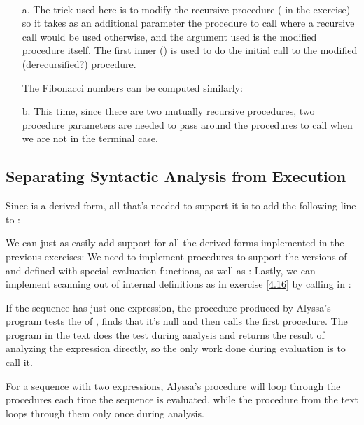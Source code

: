 \begin{exe}[4.21]
    \ \vspace{-20pt}
    \begin{itemize}
	\item[a.] The trick used here is to modify the recursive procedure 
	    ( in the exercise) so it takes as an 
	    additional parameter the procedure to call where a recursive call 
	    would be used otherwise, and the argument used is the modified 
	    procedure itself. The first inner 
	    () is used to do the initial call to the 
	    modified (derecursified?) procedure.

	    The Fibonacci numbers can be computed similarly:

	\item[b.] This time, since there are two mutually recursive procedures, 
	    two procedure parameters are needed to pass around the procedures to 
	    call when we are not in the terminal case.
    \end{itemize}
\end{exe}

\subsection{Separating Syntactic Analysis from Execution}
\label{analysis}

\begin{exe}[4.22]
    Since  is a derived form, all that’s needed to support it is to 
    add the following line to :
    \begin{comp}
        We can just as easily add support for all the derived forms implemented 
        in the previous exercises:
        We need to implement  procedures to support the versions of 
         and  defined with special evaluation functions, as 
        well as :
        Lastly, we can implement scanning out of internal definitions as in 
        exercise \ref{4.16} by calling  in 
        :
    \end{comp}
\end{exe}

\begin{exe}[4.23]
    If the sequence has just one expression, the procedure produced by Alyssa’s 
    program tests the  of , finds that it’s null and then 
    calls the first procedure. The program in the text does the test during 
    analysis and returns the result of analyzing the expression directly, so the 
    only work done during evaluation is to call it.

    For a sequence with two expressions, Alyssa’s procedure will loop through 
    the procedures each time the sequence is evaluated, while the procedure from 
    the text loops through them only once during analysis.
\end{exe}

